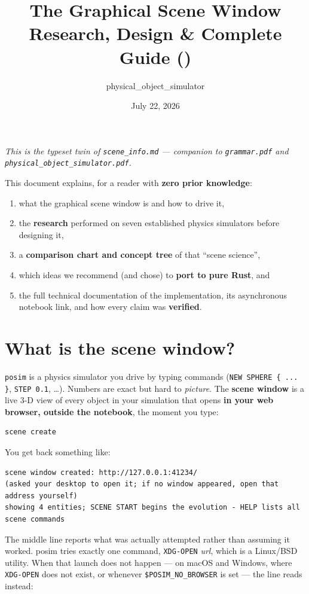\documentclass[11pt]{article}
\title{The \code{posim} Graphical Scene Window\\[2pt]
       \large Research, Design \& Complete Guide (\code{scene\_info})}
\author{physical\_object\_simulator}
\date{July 22, 2026}
\newcommand{\kw}[1]{\texttt{\uppercase{#1}}}
\newcommand{\code}[1]{\texttt{#1}}
\begin{document}
\maketitle

\noindent\emph{This is the typeset twin of \code{scene\_info.md} ---
companion to \code{grammar.pdf} and
\code{physical\_object\_simulator.pdf}.}

This document explains, for a reader with \textbf{zero prior knowledge}:
\begin{enumerate}
\item what the graphical scene window is and how to drive it,
\item the \textbf{research} performed on seven established physics
      simulators before designing it,
\item a \textbf{comparison chart and concept tree} of that ``scene
      science'',
\item which ideas we recommend (and chose) to \textbf{port to pure
      Rust}, and
\item the full technical documentation of the implementation, its
      asynchronous notebook link, and how every claim was
      \textbf{verified}.
\end{enumerate}

\tableofcontents

\section{What is the scene window?}

\code{posim} is a physics simulator you drive by typing commands
(\code{NEW SPHERE \{ ... \}}, \code{STEP 0.1}, \ldots). Numbers are
exact but hard to \emph{picture}. The \textbf{scene window} is a live
3-D view of every object in your simulation that opens \textbf{in your
web browser, outside the notebook}, the moment you type:

\begin{lstlisting}
scene create
\end{lstlisting}

You get back something like:

\begin{lstlisting}
scene window created: http://127.0.0.1:41234/
(asked your desktop to open it; if no window appeared, open that address yourself)
showing 4 entities; SCENE START begins the evolution - HELP lists all scene commands
\end{lstlisting}

The middle line reports what was actually attempted rather than assuming
it worked. posim tries exactly one command, \kw{xdg-open} \textit{url},
which is a Linux/BSD utility. When that launch does not happen --- on
macOS and Windows, where \kw{xdg-open} does not exist, or whenever
\verb|$POSIM_NO_BROWSER| is set --- the line reads instead:
\end{document}
